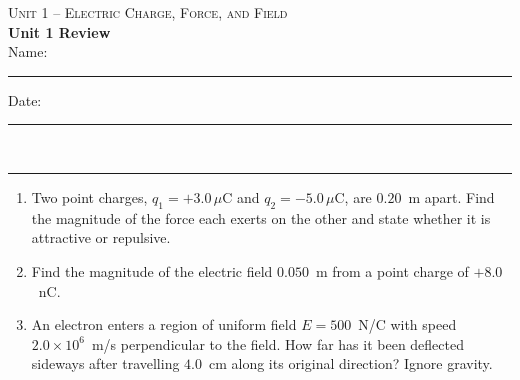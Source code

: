 \documentclass[11pt,letterpaper]{article}
\begin{document}
{\small\textsc{Unit 1 -- Electric Charge, Force, and Field}}\\[2pt]{\Large\bfseries Unit 1 Review}\\[8pt]Name: \rule{2.4in}{0.4pt} \hfill Date: \rule{1.4in}{0.4pt}\\[4pt]\hrule\vspace{10pt}{\small\itshape Placeholder worksheet for the site prototype. Free for classroom use.}\vspace{6pt}
\begin{enumerate}[leftmargin=*,itemsep=10pt]
\item Two point charges, $q_1 = +3.0\,\mu\text{C}$ and $q_2 = -5.0\,\mu\text{C}$, are $0.20$~m apart. Find the magnitude of the force each exerts on the other and state whether it is attractive or repulsive.
\vspace{2.2in}
\item Find the magnitude of the electric field $0.050$~m from a point charge of $+8.0$~nC.
\vspace{2.2in}
\item An electron enters a region of uniform field $E = 500$~N/C with speed $2.0\times10^{6}$~m/s perpendicular to the field. How far has it been deflected sideways after travelling $4.0$~cm along its original direction? Ignore gravity.
\vspace{2.2in}
\end{enumerate}
\end{document}
